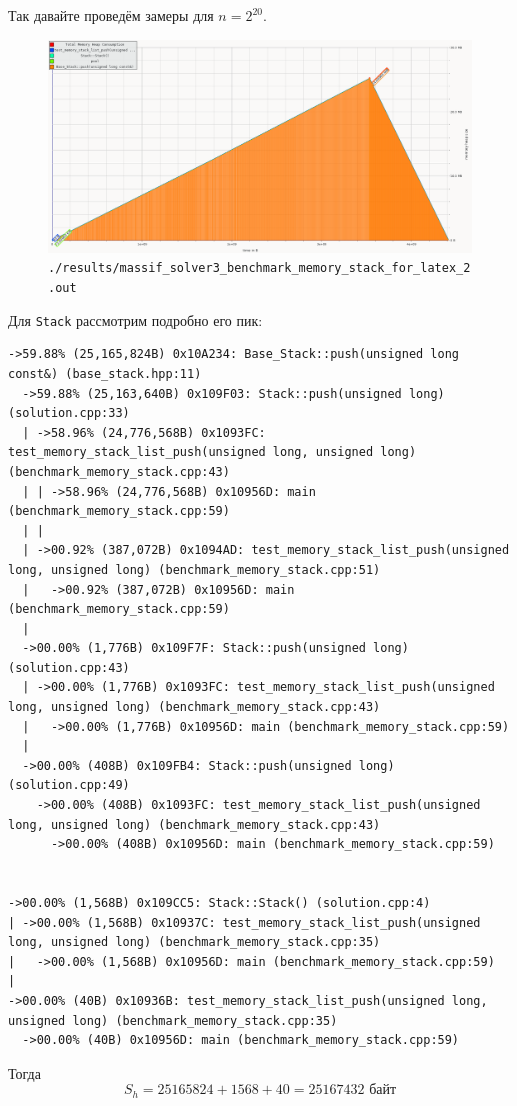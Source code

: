 Так давайте проведём замеры для \(n = 2^{20}\). 
\begin{figure}[H]
  \centering
  \includegraphics[width=1.0\textwidth]{../../resources/memory_consumption_of_solver3_benchmark_memory_stack_with_list_2.png}
  \caption{\texttt{./results/massif_solver3_benchmark_memory_stack_for_latex_2.out}}
\end{figure}
Для \texttt{Stack} рассмотрим подробно его пик:
\begin{lstlisting}[caption={}, label={}, style=style_code_block]
->59.88% (25,165,824B) 0x10A234: Base_Stack::push(unsigned long const&) (base_stack.hpp:11)
  ->59.88% (25,163,640B) 0x109F03: Stack::push(unsigned long) (solution.cpp:33)
  | ->58.96% (24,776,568B) 0x1093FC: test_memory_stack_list_push(unsigned long, unsigned long) (benchmark_memory_stack.cpp:43)
  | | ->58.96% (24,776,568B) 0x10956D: main (benchmark_memory_stack.cpp:59)
  | |   
  | ->00.92% (387,072B) 0x1094AD: test_memory_stack_list_push(unsigned long, unsigned long) (benchmark_memory_stack.cpp:51)
  |   ->00.92% (387,072B) 0x10956D: main (benchmark_memory_stack.cpp:59)
  |     
  ->00.00% (1,776B) 0x109F7F: Stack::push(unsigned long) (solution.cpp:43)
  | ->00.00% (1,776B) 0x1093FC: test_memory_stack_list_push(unsigned long, unsigned long) (benchmark_memory_stack.cpp:43)
  |   ->00.00% (1,776B) 0x10956D: main (benchmark_memory_stack.cpp:59)
  |     
  ->00.00% (408B) 0x109FB4: Stack::push(unsigned long) (solution.cpp:49)
    ->00.00% (408B) 0x1093FC: test_memory_stack_list_push(unsigned long, unsigned long) (benchmark_memory_stack.cpp:43)
      ->00.00% (408B) 0x10956D: main (benchmark_memory_stack.cpp:59)
        

->00.00% (1,568B) 0x109CC5: Stack::Stack() (solution.cpp:4)
| ->00.00% (1,568B) 0x10937C: test_memory_stack_list_push(unsigned long, unsigned long) (benchmark_memory_stack.cpp:35)
|   ->00.00% (1,568B) 0x10956D: main (benchmark_memory_stack.cpp:59)
|     
->00.00% (40B) 0x10936B: test_memory_stack_list_push(unsigned long, unsigned long) (benchmark_memory_stack.cpp:35)
  ->00.00% (40B) 0x10956D: main (benchmark_memory_stack.cpp:59)
\end{lstlisting}
Тогда
\begin{dmath*}
  S_h = 25165824 + 1568 + 40 = 25167432 \text{ байт}
\end{dmath*}

